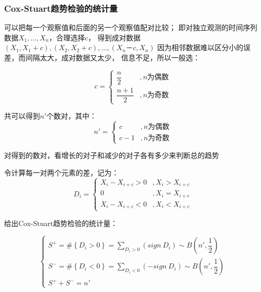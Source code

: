 \documentclass[UTF8]{ctexart}
\numberwithin{equation}{section}
\begin{document}
\subsubsection{Cox-Stuart趋势检验的统计量}

可以把每一个观察值和后面的另一个观察值配对比较；
即对独立观测的时间序列数据$X_1, \dots, X_n$，合理选择c，
得到成对数据$(X_1, X_1+c), (X_2, X_2+c),\dots , (X_n－c, X_n)$
因为相邻数据难以区分小的误差，而间隔太大，成对数据又太少，
信息不足，所以一般选：

\begin{equation}
    c = 
    \begin{cases}
        \dfrac{n}{2} &, n\mbox{为偶数} \\
        \dfrac{n+1}{2} &, n\mbox{为奇数}
    \end{cases}
    \nonumber
\end{equation}

共可以得到$n'$个数对，其中：
\begin{equation}
    n' = 
    \begin{cases}
        c &, n \mbox{为偶数} \\
        c-1 &, n \mbox{为奇数}
    \end{cases}
    \nonumber
\end{equation}

对得到的数对，看增长的对子和减少的对子各有多少来判断总的趋势

令计算每一对两个元素的差，记为：
\begin{equation}
    D_i = 
    \begin{cases}
        X_i - X_{i+c} > 0 &, X_i > X_{i+c} \\
        0 &, X_i = X_{i+c} \\
        X_i - X_{i+c} < 0 &, X_i < X_{i+c} 
    \end{cases}
    \nonumber
\end{equation}

给出Cox-Stuart趋势检验的统计量：

\begin{equation}
    \begin{cases}
        S^+ = \# \left\{ D_i > 0 \right\} = \sum_{D_i >0} (sign~D_i) \sim B(n', \dfrac{1}{2})\\[1em]
        S^- = \# \left\{ D_i < 0 \right\} = \sum_{D_i <0} (-sign~D_i) \sim B(n', \dfrac{1}{2})\\[1em]
        S^+ + S^- = n'
    \end{cases}
    \nonumber
\end{equation}
\end{document}
